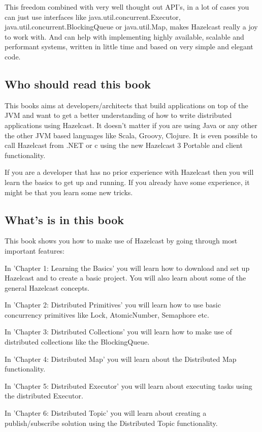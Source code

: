 This freedom combined with very well thought out API's, in a lot of cases you can just use interfaces like java.util.concurrent.Executor, java.util.concurrent.BlockingQueue or java.util.Map, makes Hazelcast really a joy to work with. And can help with implementing highly available, scalable and performant systems, written in little time and based on very simple and elegant code.

\subsection*{Who should read this book}
This books aims at developers/architects that build applications on top of the JVM and want to get a better understanding of how to write distributed applications using Hazelcast. It doesn't matter if you are using Java or any other the other JVM based languages like Scala, Groovy, Clojure. It is even possible to call Hazelcast from .NET or c using the new Hazelcast 3 Portable and client functionality.

If you are a developer that has no prior experience with Hazelcast then you will learn the basics to get up and running. If you already have some experience, it might be that you learn some new tricks.
 
\subsection*{What's is in this book}
This book shows you how to make use of Hazelcast by going through most important features:

In 'Chapter 1: Learning the Basics' you will learn how to download and set up Hazelcast and to create a basic project. You will also learn about some of the general Hazelcast concepts.

In 'Chapter 2: Distributed Primitives' you will learn how to use basic concurrency primitives like Lock, AtomicNumber, Semaphore etc.

In 'Chapter 3: Distributed Collections' you will learn how to make use of distributed collections like the BlockingQueue.

In 'Chapter 4: Distributed Map' you will learn about the Distributed Map functionality.

In 'Chapter 5: Distributed Executor' you will learn about executing tasks using the distributed Executor.

In 'Chapter 6: Distributed Topic' you will learn about creating a publish/subscribe solution using the Distributed Topic functionality.

